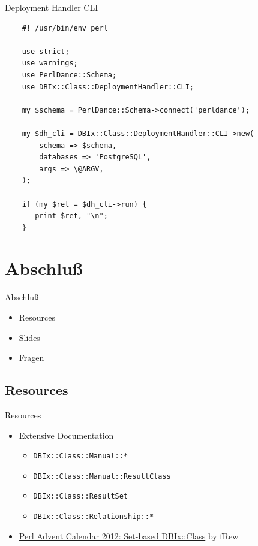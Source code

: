 \begin{frame}[fragile]{Deployment Handler CLI}
\begin{lstlisting}
    #! /usr/bin/env perl

    use strict;
    use warnings;
    use PerlDance::Schema;
    use DBIx::Class::DeploymentHandler::CLI;

    my $schema = PerlDance::Schema->connect('perldance');

    my $dh_cli = DBIx::Class::DeploymentHandler::CLI->new(
        schema => $schema,
        databases => 'PostgreSQL',
        args => \@ARGV,
    );

    if (my $ret = $dh_cli->run) {
       print $ret, "\n";
    }
\end{lstlisting}
\end{frame}

\section{Abschluß}

\begin{frame}{Abschluß}
\begin{itemize}
\item Resources
\item Slides
\item Fragen
\end{itemize}
\end{frame}

\subsection{Resources}
\begin{frame}[fragile]{Resources}
\begin{itemize}
\item Extensive Documentation
\begin{itemize}
\item \verb|DBIx::Class::Manual::*|
\item \verb|DBIx::Class::Manual::ResultClass|
\item \verb|DBIx::Class::ResultSet|
\item \verb|DBIx::Class::Relationship::*|
\end{itemize}
\item \href{http://www.perladvent.org/2012/2012-12-21.html}
{Perl Advent Calendar 2012: Set-based DBIx::Class}
by fRew
\end{itemize}
\end{frame}


